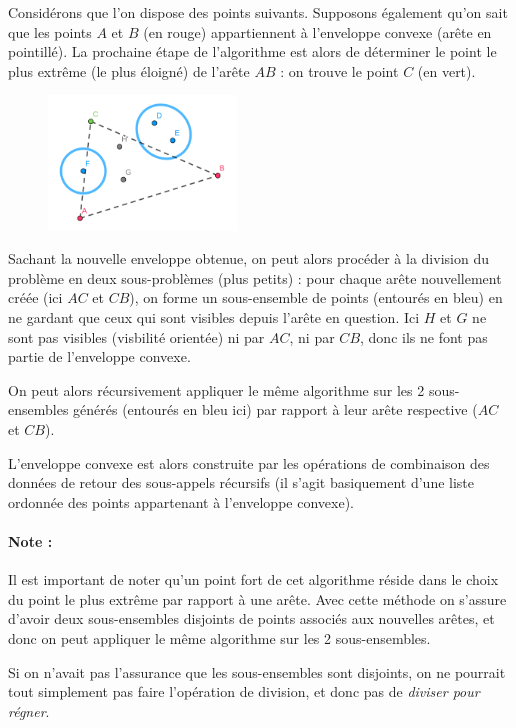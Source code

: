 \documentclass[]{article}
\begin{document}
Considérons que l'on dispose des points suivants. Supposons également qu'on sait que les points $A$ et $B$ (en rouge) appartiennent à l'enveloppe convexe (arête en pointillé). La prochaine étape de l'algorithme est alors de déterminer le point le plus extrême (le plus éloigné) de l'arête $AB$ : on trouve le point $C$ (en vert).

\begin{figure}[H]
	\begin{center}
		\includegraphics[width=5cm]{qh2d/geogebra-export4.png}
	\end{center}
\end{figure}

Sachant la nouvelle enveloppe obtenue, on peut alors procéder à la division du problème en deux sous-problèmes (plus petits) : pour chaque arête nouvellement créée (ici $AC$ et $CB$), on forme un sous-ensemble de points (entourés en bleu) en ne gardant que ceux qui sont visibles depuis l'arête en question. Ici $H$ et $G$ ne sont pas visibles (visbilité orientée) ni par $AC$, ni par $CB$, donc ils ne font pas partie de l'enveloppe convexe.

On peut alors récursivement appliquer le même algorithme sur les 2 sous-ensembles générés (entourés en bleu ici) par rapport à leur arête respective ($AC$ et $CB$).

L'enveloppe convexe est alors construite par les opérations de combinaison des données de retour des sous-appels récursifs (il s'agit basiquement d'une liste ordonnée des points appartenant à l'enveloppe convexe).

\paragraph{Note :}
Il est important de noter qu'un point fort de cet algorithme réside dans le choix du point le plus extrême par rapport à une arête. Avec cette méthode on s'assure d'avoir deux sous-ensembles disjoints de points associés aux nouvelles arêtes, et donc on peut appliquer le même algorithme sur les 2 sous-ensembles.

Si on n'avait pas l'assurance que les sous-ensembles sont disjoints, on ne pourrait tout simplement pas faire l'opération de division, et donc pas de \emph{diviser pour régner}.
\end{document}
